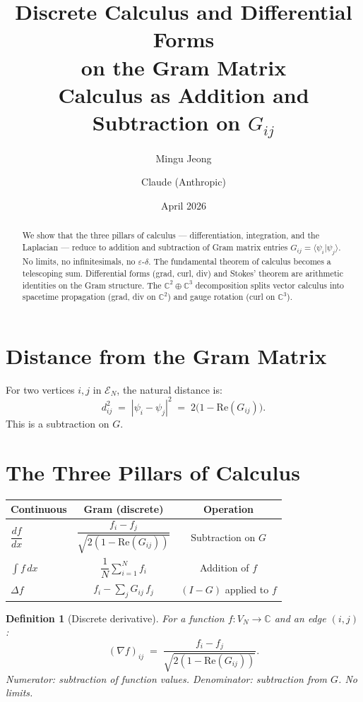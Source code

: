 \documentclass[11pt]{article}
\title{Discrete Calculus and Differential Forms\\
  on the Gram Matrix\\[6pt]
  {\large Calculus as Addition and Subtraction on $G_{ij}$}}
\author{Mingu Jeong \and Claude (Anthropic)}
\date{April 2026}
\newtheorem{definition}[theorem]{Definition}
\begin{document}
\maketitle

\begin{abstract}
We show that the three pillars of calculus --- differentiation,
integration, and the Laplacian --- reduce to addition and
subtraction of Gram matrix entries $G_{ij} = \langle\psi_i|\psi_j\rangle$.
No limits, no infinitesimals, no $\varepsilon$-$\delta$.
The fundamental theorem of calculus becomes a telescoping sum.
Differential forms (grad, curl, div) and Stokes' theorem
are arithmetic identities on the Gram structure.
The $\mathbb{C}^2 \oplus \mathbb{C}^3$ decomposition
splits vector calculus into spacetime propagation (grad, div on
$\mathbb{C}^2$) and gauge rotation (curl on $\mathbb{C}^3$).
\end{abstract}

\section{Distance from the Gram Matrix}

For two vertices $i, j$ in $\mathcal{E}_N$, the natural distance is:
\[
  d_{ij}^2 \;=\; |\psi_i - \psi_j|^2
  \;=\; 2\bigl(1 - \mathrm{Re}(G_{ij})\bigr).
\]
This is a subtraction on $G$.

\section{The Three Pillars of Calculus}

\begin{center}
\renewcommand{\arraystretch}{1.5}
\begin{tabular}{>{\raggedright}p{3cm}|c|c}
\textbf{Continuous} & \textbf{Gram (discrete)} & \textbf{Operation} \\
\hline
$\dfrac{df}{dx}$ &
  $\dfrac{f_i - f_j}{\sqrt{2(1 - \mathrm{Re}(G_{ij}))}}$ &
  Subtraction on $G$ \\[8pt]
$\displaystyle\int f\,dx$ &
  $\dfrac{1}{N}\displaystyle\sum_{i=1}^{N} f_i$ &
  Addition of $f$ \\[8pt]
$\Delta f$ &
  $f_i - \displaystyle\sum_j G_{ij}\, f_j$ &
  $(I - G)$ applied to $f$ \\
\end{tabular}
\end{center}

\begin{definition}[Discrete derivative]
For a function $f: V_N \to \mathbb{C}$ and an edge $(i,j)$:
\[
  (\nabla f)_{ij} \;=\;
  \frac{f_i - f_j}{\sqrt{2(1 - \mathrm{Re}(G_{ij}))}}.
\]
Numerator: subtraction of function values.
Denominator: subtraction from $G$.
No limits.
\end{definition}
\end{document}
